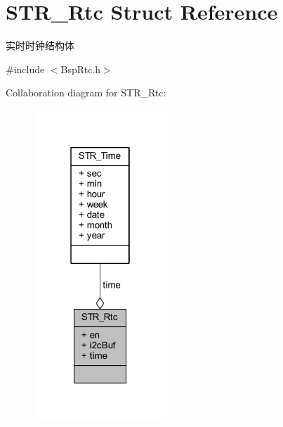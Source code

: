 \hypertarget{struct_s_t_r___rtc}{\section{\-S\-T\-R\-\_\-\-Rtc \-Struct \-Reference}
\label{struct_s_t_r___rtc}
}


实时时钟结构体  




{\ttfamily \#include $<$\-Bsp\-Rtc.\-h$>$}



\-Collaboration diagram for \-S\-T\-R\-\_\-\-Rtc\-:\nopagebreak
\begin{figure}[H]
\begin{center}
\leavevmode
\includegraphics[width=142pt]{struct_s_t_r___rtc__coll__graph}
\end{center}
\end{figure}
